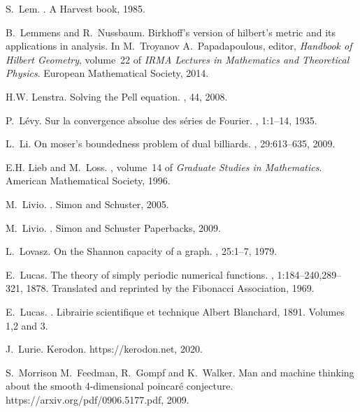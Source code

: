 \documentclass[12pt]{amsart}
\begin{document}
\begin{thebibliography}{100}
S.~Lem.
.
\newblock A Harvest book, 1985.

B.~Lemmens and R.~Nussbaum.
\newblock Birkhoff's version of hilbert's metric and its applications in
  analysis.
\newblock In M.~Troyanov A.~Papadapoulous, editor, {\em Handbook of Hilbert
  Geometry}, volume~22 of {\em IRMA Lectures in Mathematics and Theoretical
  Physics}. European Mathematical Society, 2014.

H.W. Lenstra.
\newblock Solving the {P}ell equation.
, 44, 2008.

P.~{L\'evy}.
\newblock Sur la convergence absolue des {s\'eries de Fourier}.
, 1:1--14, 1935.

L.~Li.
\newblock On moser's boundedness problem of dual billiards.
, 29:613--635, 2009.

E.H. Lieb and M.~Loss.
, volume~14 of {\em Graduate Studies in Mathematics}.
\newblock American Mathematical Society, 1996.

M.~Livio.
.
\newblock Simon and Schuster, 2005.

M.~Livio.
.
\newblock Simon and Schuster Paperbacks, 2009.

L.~Lovasz.
\newblock On the {S}hannon capacity of a graph.
, 25:1--7, 1979.

E.~Lucas.
\newblock The theory of simply periodic numerical functions.
, 1:184--240,289--321, 1878.
\newblock Translated and reprinted by the Fibonacci Association, 1969.

E.~Lucas.
.
\newblock Librairie scientifique et technique Albert Blanchard, 1891.
\newblock Volumes 1,2 and 3.

J.~Lurie.
\newblock Kerodon.
\newblock https://kerodon.net, 2020.

S.~Morrison M.~Feedman, R.~Gompf and K.~Walker.
\newblock Man and machine thinking about the smooth 4-dimensional poincar\'e
  conjecture.
\newblock https://arxiv.org/pdf/0906.5177.pdf, 2009.


\end{thebibliography}
\end{document}
